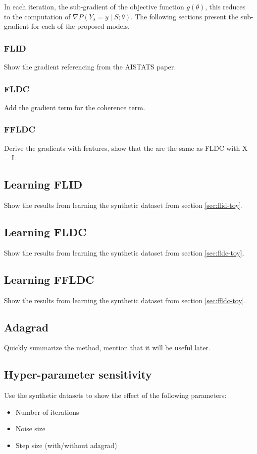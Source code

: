 In each iteration, the sub-gradient of the objective function $g(\theta)$, this reduces to the computation of $\nabla P(Y_{s} = y \mid S;\theta)$. The following sections present the sub-gradient for each of the proposed models.

\subsubsection{FLID}

Show the gradient referencing from the AISTATS paper.

\subsubsection{FLDC}

Add the gradient term for the coherence term.

\subsubsection{FFLDC}

Derive the gradients with features, show that the are the same as FLDC with X = I.

\subsection{Learning FLID}

Show the results from learning the synthetic dataset from section \ref{sec:flid-toy}.

\subsection{Learning FLDC}

Show the results from learning the synthetic dataset from section \ref{sec:fldc-toy}.

\subsection{Learning FFLDC}

Show the results from learning the synthetic dataset from section \ref{sec:ffldc-toy}.

\subsection{Adagrad}

Quickly summarize the method, mention that it will be useful later.

\subsection{Hyper-parameter sensitivity}

Use the synthetic datasets to show the effect of the following parameters:

\begin{itemize}
  \item Number of iterations
  \item Noise size
  \item Step size (with/without adagrad)
\end{itemize}

